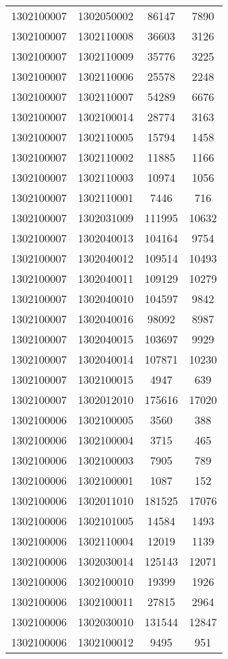 \begin{longtable}[h]{llcc}
		1302100007 & 1302050002 & 86147 & 7890\\
		1302100007 & 1302110008 & 36603 & 3126\\
		1302100007 & 1302110009 & 35776 & 3225\\
		1302100007 & 1302110006 & 25578 & 2248\\
		1302100007 & 1302110007 & 54289 & 6676\\
		1302100007 & 1302100014 & 28774 & 3163\\
		1302100007 & 1302110005 & 15794 & 1458\\
		1302100007 & 1302110002 & 11885 & 1166\\
		1302100007 & 1302110003 & 10974 & 1056\\
		1302100007 & 1302110001 & 7446 & 716\\
		1302100007 & 1302031009 & 111995 & 10632\\
		1302100007 & 1302040013 & 104164 & 9754\\
		1302100007 & 1302040012 & 109514 & 10493\\
		1302100007 & 1302040011 & 109129 & 10279\\
		1302100007 & 1302040010 & 104597 & 9842\\
		1302100007 & 1302040016 & 98092 & 8987\\
		1302100007 & 1302040015 & 103697 & 9929\\
		1302100007 & 1302040014 & 107871 & 10230\\
		1302100007 & 1302100015 & 4947 & 639\\
		1302100007 & 1302012010 & 175616 & 17020\\
		1302100006 & 1302100005 & 3560 & 388\\
		1302100006 & 1302100004 & 3715 & 465\\
		1302100006 & 1302100003 & 7905 & 789\\
		1302100006 & 1302100001 & 1087 & 152\\
		1302100006 & 1302011010 & 181525 & 17076\\
		1302100006 & 1302101005 & 14584 & 1493\\
		1302100006 & 1302110004 & 12019 & 1139\\
		1302100006 & 1302030014 & 125143 & 12071\\
		1302100006 & 1302100010 & 19399 & 1926\\
		1302100006 & 1302100011 & 27815 & 2964\\
		1302100006 & 1302030010 & 131544 & 12847\\
		1302100006 & 1302100012 & 9495 & 951\\

\end{longtable}
